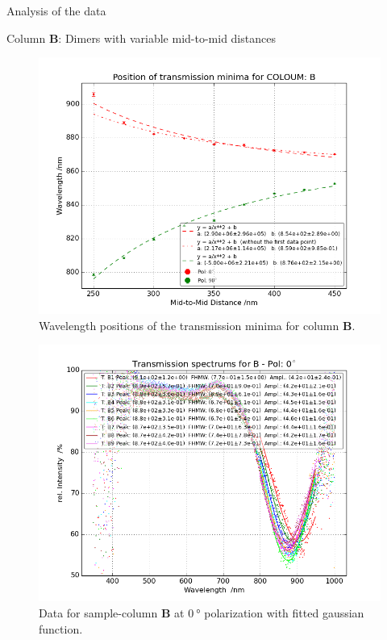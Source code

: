 \documentclass[pdftex, a4paper,11pt, twoside, UKenglish]{report}
\begin{document}
\begin{chapter}{Analysis of the data}
\begin{section}{Column \textbf{B}: Dimers with variable mid-to-mid
        distances}
      \begin{figure}[b!]
        \centering
        \includegraphics[width=\textwidth]{Figures/MinimaPosB.png}
        \caption{Wavelength positions of the transmission minima for column
            \textbf{B}.}
        \label{fig:MinimaPosB}
      \end{figure}
      \newpage
      \begin{figure}[ht!]
        \centering
        \begin{minipage}{.95\textwidth}
          \centering
          \includegraphics[width=\textwidth]
              {Figures/TransspecFIT_BPol0.png}
          \caption{Data for sample-column \textbf{B} at $\SI{0}{\degree}$
              polarization with fitted gaussian function.}

\end{minipage}
\end{figure}
\end{section}
\end{chapter}
\end{document}
